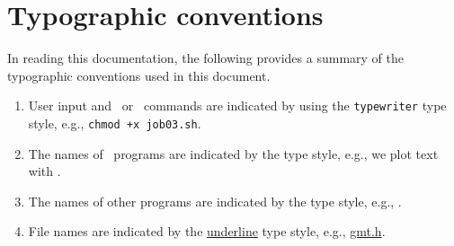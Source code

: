 
\chapter*{Typographic conventions}

In reading this documentation, the following provides a summary of
the typographic conventions used in this document.

\begin{enumerate}

\item User input and \GMT\ or \UNIX\ commands are indicated by
using the \texttt{typewriter} type style, e.g., \texttt{chmod +x job03.sh}.

\item The names of \GMT\ programs are indicated by the
 type style, e.g., we plot text with .

\item The names of other programs are indicated by the
 type style, e.g., .

\item File names are indicated by the \underline{underline}
type style, e.g., \underline{gmt.h}.

\end{enumerate}
